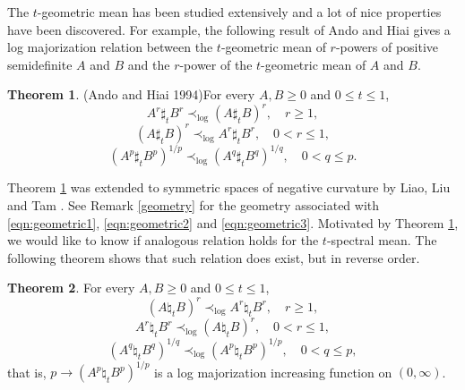 \documentclass[12pt, reqno]{amsart}
\numberwithin{equation}{section}
\theoremstyle{definition}
\newtheorem{theorem}{Theorem}[section]
\renewcommand{\ge}{\geqslant}
\renewcommand{\le}{\leqslant}
\begin{document}
The $t$-geometric mean has been studied extensively and a lot of nice properties have been discovered. For example, the following result of Ando and Hiai \cite[Theorem 2.1]{AH94} gives a log majorization relation between the $t$-geometric mean of $r$-powers of positive semidefinite $A$ and $B$ and the $r$-power of the $t$-geometric mean of $A$ and $B$.  
\begin{theorem}(Ando and Hiai 1994)\label{Thm:AH}
For every $A, B \ge 0$ and $0\le t \le 1$,
\begin{equation}\label{eqn:geometric1}
A^r \sharp_t B^r  \prec_{\log} (A\sharp_t B)^r,  \quad r\ge 1,
\end{equation}
\begin{equation}\label{eqn:geometric2}
(A\sharp_t B)^r\prec_{\log}  A^r \sharp_t B^r,\quad 0< r\le 1,
\end{equation}
\begin{equation}\label{eqn:geometric3}
(A^p \sharp_t B^p)^{1/p}	\prec_{\log}  (A^q \sharp_t B^q)^{1/q}, \quad 0<q\le p.
\end{equation}
\end{theorem}

Theorem  \ref{Thm:AH} was extended to symmetric spaces of negative curvature by Liao, Liu and Tam \cite [Theorem 3.7]{LLT14}. See Remark \ref{geometry} for the geometry associated with \eqref{eqn:geometric1}, \eqref{eqn:geometric2} and \eqref{eqn:geometric3}. Motivated by Theorem \ref{Thm:AH}, we would like to know if analogous  relation holds for {the} $t$-spectral mean. The following theorem shows that such relation does exist, but in reverse order.
\begin{theorem}\label{Thm:spectral-power}\rm 
For every $A, B \ge 0$ and $0\le t \le 1$,
\begin{equation}\label{eqn:spectral1}
(A\natural_t B)^r \prec_{\log} A^r \natural_t B^r, \quad r\ge 1,
\end{equation}
\begin{equation}\label{eqn:spectral2}
A^r \natural_t B^r\prec_{\log} (A\natural_t B)^r ,\quad 0< r\le 1,
\end{equation}
\begin{equation}\label{eqn:spectral3}
 (A^q \natural_t B^q)^{1/q}\prec_{\log}(A^p \natural_t B^p)^{1/p}, \quad 0<q\le p,
 \end{equation}
that is, $p\to  (A^p \natural_t B^p)^{1/p}$ is a log majorization increasing function on $(0,\infty)$.

\end{theorem}
\end{document}
